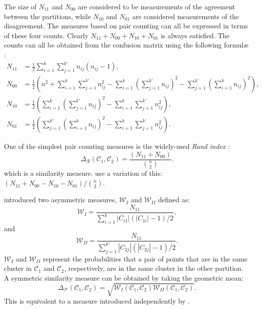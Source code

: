 \documentclass[a4paper]{report}
\newcommand{\clus}{\mathcal{C}}
\newcommand{\partcompare}[1]{\Delta_{\mathcal{#1}}(\clus_1,\clus_2)}
\begin{document}
The size of $N_{11}$ and $N_{00}$ are considered to be measurements of the
agreement between the partitions, while $N_{10}$ and $N_{01}$ are considered
measurements of the disagreement.  The measures based on pair counting can all
be expressed in terms of these four counts.  Clearly
$N_{11}+N_{00}+N_{10}+N_{01}$ is always satisfied.  The counts can all be
obtained from the confusion matrix using the following formul\ae
\citep{hubert-arabie-1985}:
\begin{align*}
  N_{11} &= \frac{1}{2} \sum_{i=1}^{k} \sum_{j=1}^{k'} n_{ij}(n_{ij}-1),\\
  N_{00} &= \frac{1}{2} \left(n^2 + \sum_{i=1}^{k} \sum_{j=1}^{k'} n_{ij}^2
                             - \sum_{i=1}^{k}
                                \left(\sum_{j=1}^{k'} n_{ij} \right)^2
                             - \sum_{j=1}^{k'}
                                \left(\sum_{i=1}^{k} n_{ij} \right)^2
                       \right),\\
  N_{10} &= \frac{1}{2} \left(\sum_{i=1}^{k}
                              \left(\sum_{j=1}^{k'} n_{ij} \right)^2
                             - \sum_{i=1}^{k} \sum_{j=1}^{k'} n_{ij}^2
                       \right),\\
  N_{01} &= \frac{1}{2} \left(\sum_{j=1}^{k'}
                              \left(\sum_{i=1}^{k} n_{ij} \right)^2
                             - \sum_{i=1}^{k} \sum_{j=1}^{k'} n_{ij}^2
                       \right).
\end{align*}

One of the simplest pair counting measures is the widely-used \textit{Rand
  index} \citep{rand-1971}:
\begin{equation*}
\partcompare{R} = \frac{(N_{11}+N_{00})}{\binom{n}{2}}.
\end{equation*}
which is a similarity measure.  \citet{hubert-arabie-1985} use a variation of
this: $(N_{11}+N_{00}-N_{10}-N_{01})/\binom{n}{2}$.

\citet{wallace-1983} introduced two asymmetric measures, $\mathcal{W}_{I}$ and
$\mathcal{W}_{II}$ defined as:
\begin{equation*}
  \mathcal{W}_{I} = \frac{N_{11}}{\sum_{i=1}^{k} |C_{i1}|(|C_{1i}|-1)/2},
\end{equation*}
and
\begin{equation*}
  \mathcal{W}_{II} = \frac{N_{11}}{\sum_{j=1}^{k'} |C_{2j}|(|C_{2j}|-1)/2}.
\end{equation*}
$\mathcal{W}_{I}$ and $\mathcal{W}_{II}$ represent the probabilities that a
pair of points that are in the same cluster in $\clus_1$ and $\clus_2$,
respectively, are in the same cluster in the other partition.  A symmetric
similarity measure can be obtained by taking the geometric mean:
\begin{equation*}
  \partcompare{F} = \sqrt{\mathcal{W}_{I}(\clus_1,\clus_2)
                          \mathcal{W}_{II}(\clus_1,\clus_2)}.
\end{equation*}
This is equivalent to a measure introduced independently by
\citet{fowlkes-mallows-1983}.
\end{document}
